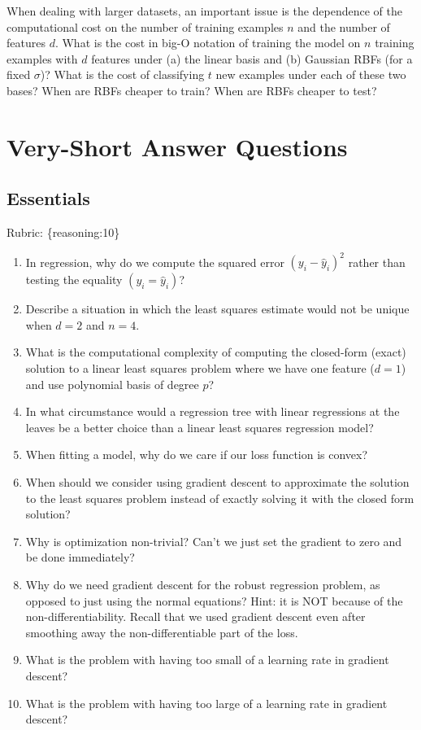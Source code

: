 \documentclass{article}
\def\rubric#1{\gre{Rubric: \{#1\}}}{}
\def\blu#1{{\color{blu}#1}}
\def\gre#1{{\color{gre}#1}}
\def\enum#1{\begin{enumerate}#1\end{enumerate}}
\begin{document}
When dealing with larger datasets, an important issue is the dependence of the
computational cost on the number of training examples $n$ and the number of
features $d$. \blu{What is the cost in big-O notation of training the model
on $n$ training examples with $d$ features under (a) the linear basis and
(b) Gaussian RBFs (for a fixed $\sigma$)? What is the cost of
classifying $t$ new examples under each of these two bases? When are RBFs
cheaper to train? When are RBFs cheaper to test?}


\section{Very-Short Answer Questions}

\subsection{Essentials}
\rubric{reasoning:10}

\enum{
\item In regression, why do we compute the squared error $(y_i - \hat{y}_i)^2$ rather than testing the equality $(y_i = \hat{y}_i)$?
\item Describe a situation in which the least squares estimate would not be unique when $d=2$ and $n=4$. 
\item What is the computational complexity of computing the closed-form (exact) solution to a linear least squares problem where we have one feature ($d = 1$) and use polynomial basis of degree $p$?
\item In what circumstance would a regression tree with linear regressions at the leaves be a better choice
than a linear least squares regression model?
\item When fitting a model, why do we care if our loss function is convex?
\item When should we consider using gradient descent to approximate the solution to the least squares problem instead of exactly solving it with the closed form solution?
\item Why is optimization non-trivial? Can't we just set the gradient to zero and be done immediately?
\item Why do we need gradient descent for the robust regression problem, as opposed to just using the normal equations? Hint: it is NOT because of the non-differentiability. Recall that we used gradient descent even after smoothing away the non-differentiable part of the loss.
\item What is the problem with having too small of a learning rate in gradient descent?
\item What is the problem with having too large of a learning rate in gradient descent?
}
\end{document}
